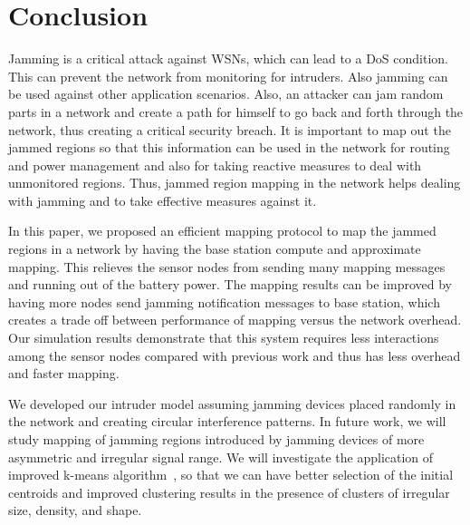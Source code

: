 \documentclass[conference]{IEEEtran}
\begin{document}
\section{Conclusion}
\label{conc}

Jamming is a critical attack against WSNs, which can lead to a DoS condition. This can prevent the network from monitoring for intruders. Also jamming can be used against other application scenarios. Also, an attacker can jam random parts in a network and create a path for himself to go back and forth through the network, thus creating a critical security breach. It is important to map out the jammed regions so that this information can be used in the network for routing and power management and also for taking reactive measures to deal with unmonitored regions. Thus, jammed region mapping in the network helps dealing with jamming and to take effective measures against it. 
\par In this paper, we proposed an efficient mapping protocol to map the jammed regions in a network by having the base station compute and approximate mapping. This relieves the sensor nodes from sending many mapping messages and running out of the battery power. The mapping results can be improved by having more nodes send jamming notification messages to base station, which creates a trade off between performance of mapping versus the network overhead. Our simulation results demonstrate that this system requires less interactions among the sensor nodes compared with previous work and thus has less overhead and faster mapping. 
\par We developed our intruder model assuming jamming devices placed randomly in the network and creating circular interference patterns. In future work, we will study mapping of jamming regions introduced by jamming devices of more asymmetric and irregular signal range. We will investigate the application of improved k-means algorithm~\cite{KMEANSIMP1, KMEANSIMP2}, so that we can have better selection of the initial centroids and improved clustering results in the presence of clusters of irregular size, density, and shape.







\balance



\balance
\end{document}
